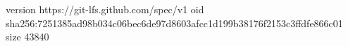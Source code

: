 version https://git-lfs.github.com/spec/v1
oid sha256:7251385ad98b034c06bec6de97d8603afcc1d199b38176f2153c3ffdfe866c01
size 43840
